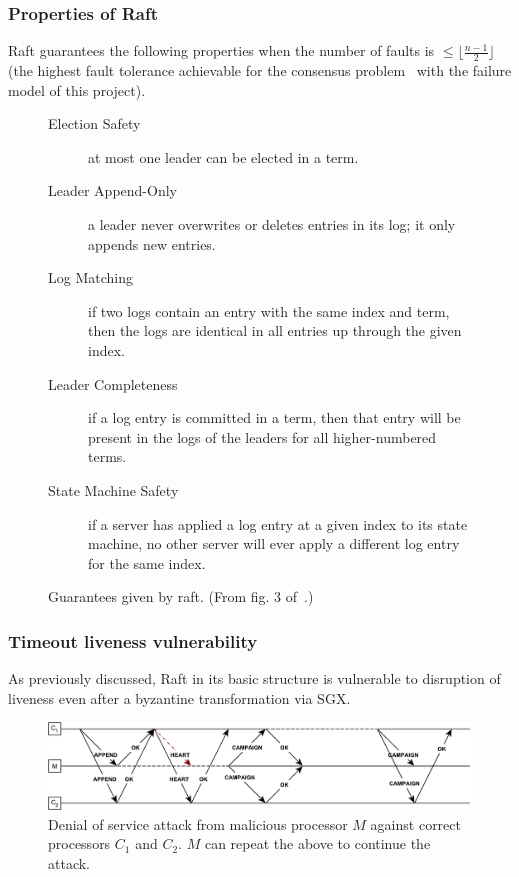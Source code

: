 \documentclass{article}
\begin{document}
	\subsubsection*{Properties of Raft}

	Raft guarantees the following properties when the number of faults is $\le \lfloor \frac{n - 1}{2} \rfloor$ (the highest fault tolerance achievable for the consensus problem~\cite{lamport_lower_2006} with the failure model of this project).
	\begin{figure}[ht!]
	  \centering
	  \begin{minipage}{0.8\textwidth}
	    \begin{mdframed}
	      \begin{description}
	        \item[Election Safety] at most one leader can be elected in a term.
	        \item[Leader Append-Only] a leader never overwrites or deletes entries in its log; it only appends new entries.
	        \item[Log Matching] if two logs contain an entry with the same index and term, then the logs are identical in all entries up through the given index.
	        \item[Leader Completeness] if a log entry is committed in a term, then that entry will be present in the logs of the leaders for all higher-numbered  terms.
	        \item[State Machine Safety] if a server has applied a log entry at a given index to its state machine, no other server will ever apply a different log entry for the same index.
	      \end{description}
	    \end{mdframed}
	  \end{minipage}
	  \caption{Guarantees given by raft. (From fig. 3 of~\cite{ongaro_search_2014}.)}
	  \label{fig:raft-properties}
	\end{figure}

	\subsubsection*{Timeout liveness vulnerability}

	As previously discussed, Raft in its basic structure is vulnerable to disruption of liveness even after a byzantine transformation via SGX.

	\begin{figure}[ht]
	  \centering
	  \includegraphics[width=\textwidth]{figures/raft-liveness-vuln.pdf}
	  \caption{Denial of service attack from malicious processor $M$ against correct processors $C_1$ and $C_2$. $M$ can repeat the above to continue the attack.}
	  \label{fig:raft-liveness-vuln}
	\end{figure}
	\FloatBarrier
	
\end{document}
